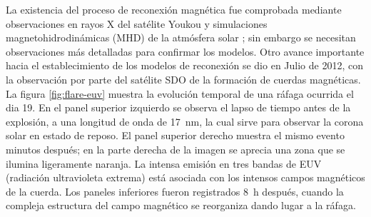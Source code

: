 La existencia del proceso de reconexión magnética fue comprobada mediante observaciones en rayos X del satélite Youkou \cite{masuda,tsuneta} y simulaciones magnetohidrodinámicas (MHD) de la atmósfera solar  \cite{yokoyama}; sin embargo se necesitan observaciones más detalladas para confirmar los modelos. Otro avance importante hacia el establecimiento de los modelos de reconexión se dio en Julio de \num{2012}, con la observación por parte del satélite SDO de la formación de cuerdas magnéticas. La figura \ref{fig:flare-euv} muestra la evolución temporal de una ráfaga ocurrida el dia \num{19}. En el panel superior izquierdo se observa el lapso de tiempo antes de la explosión, a una longitud de onda de \SI{17}{\nano\metre}, la cual sirve para observar la corona solar en estado de reposo. El panel superior derecho muestra el mismo evento minutos después; en la parte derecha de la imagen se aprecia una zona que se ilumina ligeramente naranja. La intensa emisión en tres bandas de EUV (radiación ultravioleta extrema) está asociada con los intensos campos magnéticos de la cuerda. Los paneles inferiores fueron registrados \SI{8}{\hour} después, cuando la compleja estructura del campo magnético se reorganiza dando lugar a la ráfaga.

